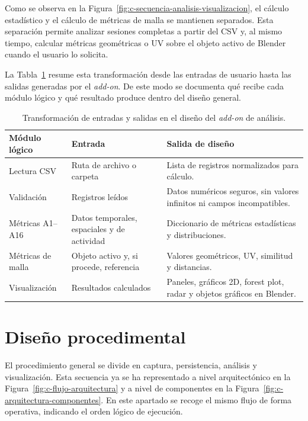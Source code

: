 Como se observa en la Figura~\ref{fig:c-secuencia-analisis-visualizacion}, el cálculo estadístico y el cálculo de métricas de malla se mantienen separados. Esta separación permite analizar sesiones completas a partir del CSV y, al mismo tiempo, calcular métricas geométricas o UV sobre el objeto activo de Blender cuando el usuario lo solicita.

La Tabla~\ref{tab:c-flujo-modulos-analisis} resume esta transformación desde las entradas de usuario hasta las salidas generadas por el \textit{add-on}. De este modo se documenta qué recibe cada módulo lógico y qué resultado produce dentro del diseño general.

\begin{table}[H]
\centering
\scriptsize
\renewcommand{\arraystretch}{1.15}
\begin{tabularx}{\textwidth}{p{3.6cm}p{4cm}X}
\toprule
\textbf{Módulo lógico} & \textbf{Entrada} & \textbf{Salida de diseño} \\
\midrule
Lectura CSV & Ruta de archivo o carpeta & Lista de registros normalizados para cálculo. \\
\midrule
Validación & Registros leídos & Datos numéricos seguros, sin valores infinitos ni campos incompatibles. \\
\midrule
Métricas A1--A16 & Datos temporales, espaciales y de actividad & Diccionario de métricas estadísticas y distribuciones. \\
\midrule
Métricas de malla & Objeto activo y, si procede, referencia & Valores geométricos, UV, similitud y distancias. \\
\midrule
Visualización & Resultados calculados & Paneles, gráficos 2D, forest plot, radar y objetos gráficos en Blender. \\
\bottomrule
\end{tabularx}
\caption{Transformación de entradas y salidas en el diseño del \textit{add-on} de análisis.}
\label{tab:c-flujo-modulos-analisis}
\end{table}

\section{Diseño procedimental}
\label{sec:c-diseno-procedimental}

El procedimiento general se divide en captura, persistencia, análisis y visualización. Esta secuencia ya se ha representado a nivel arquitectónico en la Figura~\ref{fig:c-flujo-arquitectura} y a nivel de componentes en la Figura~\ref{fig:c-arquitectura-componentes}. En este apartado se recoge el mismo flujo de forma operativa, indicando el orden lógico de ejecución.

